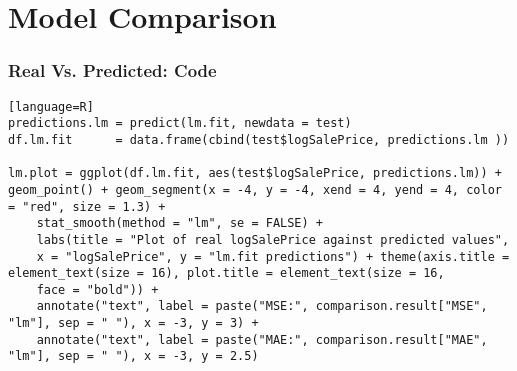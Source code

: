 \section{Model Comparison}

\begin{frame}[fragile]
\frametitle{Real Vs. Predicted: Code}

\begin{lstlisting}[basicstyle=\tiny][language=R]
predictions.lm = predict(lm.fit, newdata = test)
df.lm.fit      = data.frame(cbind(test$logSalePrice, predictions.lm ))

lm.plot = ggplot(df.lm.fit, aes(test$logSalePrice, predictions.lm)) + geom_point() + geom_segment(x = -4, y = -4, xend = 4, yend = 4, color = "red", size = 1.3) + 
    stat_smooth(method = "lm", se = FALSE) + 
    labs(title = "Plot of real logSalePrice against predicted values", 
    x = "logSalePrice", y = "lm.fit predictions") + theme(axis.title = element_text(size = 16), plot.title = element_text(size = 16, 
    face = "bold")) + 
    annotate("text", label = paste("MSE:", comparison.result["MSE", "lm"], sep = " "), x = -3, y = 3) + 
    annotate("text", label = paste("MAE:", comparison.result["MAE", "lm"], sep = " "), x = -3, y = 2.5)

\end{lstlisting}

\end{frame}


